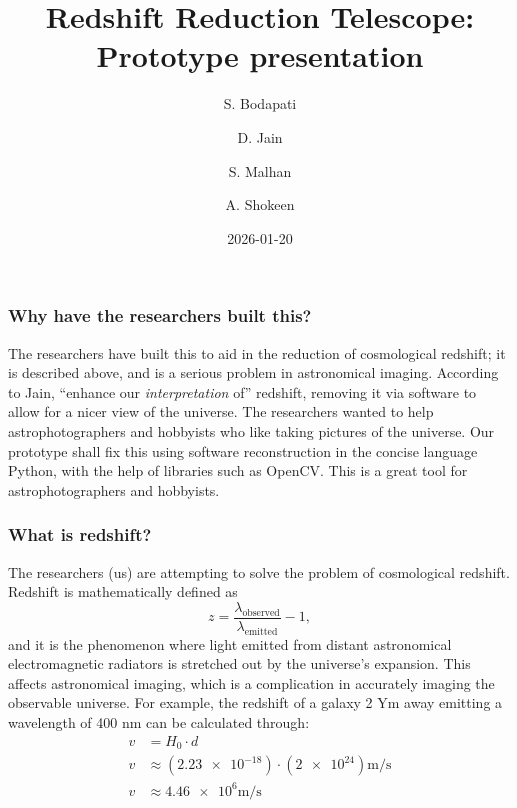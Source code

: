 \documentclass{beamer}
\author{S. Bodapati \and D. Jain \and S. Malhan \and A. Shokeen}
\date{2026-01-20}
\title{Redshift Reduction Telescope: Prototype presentation}
\begin{document}
\maketitle

\begin{frame}
    \frametitle{Why have the researchers built this?}
    The researchers have built this to aid in the reduction of cosmological redshift; it is described above, and is a serious problem in astronomical imaging. According to Jain, \enquote{enhance our \emph{interpretation} of} redshift, removing it via software to allow for a nicer view of the universe. The researchers wanted to help astrophotographers and hobbyists who like taking pictures of the universe. Our prototype shall fix this using software reconstruction in the concise language Python, with the help of libraries such as OpenCV. This is a great tool for astrophotographers and hobbyists.
\end{frame}

\begin{frame}
    \frametitle{What is redshift?}
    The researchers (us) are attempting to solve the problem of cosmological redshift. Redshift is mathematically defined as \pause\[
    z = \frac{\lambda_{\text{observed}}}{\lambda_{\text{emitted}}} - 1,
    \]\pause and it is the phenomenon where light emitted from distant astronomical electromagnetic radiators is stretched out by the universe's expansion. This affects astronomical imaging, which is a complication in accurately imaging the observable universe. \pause For example, the redshift of a galaxy 2 \unit{\yotta\metre} away emitting a wavelength of 400 \unit{\nano\metre} can be calculated through:\pause
    \begin{align*}
        v &= H_0 \cdot d\\
        v &\approx (\num{2.23e-18}) \cdot (\num{2e24}) \unit{\metre\per\second}\\
        v &\approx \num{4.46e6} \unit{\metre\per\second}
    \end{align*}
\end{frame}
\end{document}
